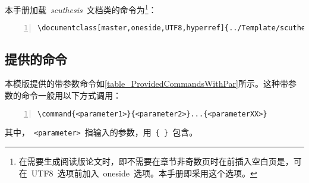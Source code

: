本手册加载~\emph{scuthesis}~文档类的命令为\footnote{在需要生成阅读版论文时，即不需要在章节非奇数页时在前插入空白页是，可在~UTF8~选项前加入~oneside~选项。本手册即采用这个选项。}：

\begin{Verbatim}[gobble=1,frame=single,numbers=left]
	\documentclass[master,oneside,UTF8,hyperref]{../Template/scuthesis}
\end{Verbatim}

\subsection{提供的命令}
\label{Subsect_ProvidedCommands}
本模版提供的带参数命令如\cref{table_ProvidedCommandsWithPar}所示。这种带参数的命令一般用以下方式调用：
\begin{Verbatim}[gobble=1,frame=single,numbers=left]
	\command{<parameter1>}{<parameter2>}...{<parameterXX>}
\end{Verbatim}
其中，~\verb|<parameter>|~指输入的参数，用~\verb|{ }|~包含。


